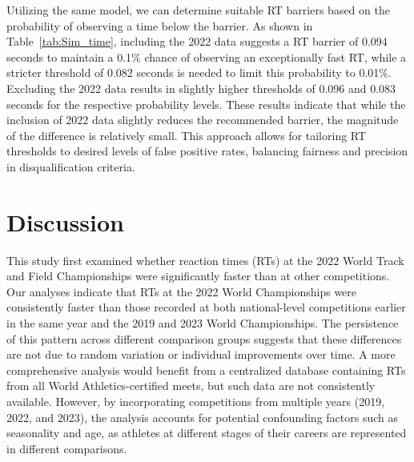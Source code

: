 \documentclass[12pt, letterpaper]{article}
\begin{document}
Utilizing the same model, we can determine suitable RT barriers
based on the probability of observing a time below the barrier. As shown in
Table~\ref{tab:Sim_time}, including the 2022 data suggests a RT
barrier of 0.094 seconds to maintain a 0.1\% chance of observing an
exceptionally fast RT, while a stricter threshold of 0.082 seconds
is needed to limit this probability to 0.01\%. Excluding the 2022 data results
in slightly higher thresholds of 0.096 and 0.083 seconds for the respective
probability levels. These results indicate that while the inclusion of 2022
data slightly reduces the recommended barrier, the magnitude of the difference
is relatively small. This approach allows for tailoring RT
thresholds to desired levels of false positive rates, balancing fairness and
precision in disqualification criteria.




\section{Discussion}\label{sec:concludingremarks}


This study first examined whether reaction times (RTs) at the 2022
World Track and Field Championships were significantly faster than at
other competitions. Our analyses indicate that RTs at the 2022 World
Championships were consistently faster than those recorded at both
national-level competitions earlier in the same year and the 2019 and
2023 World Championships. The persistence of this pattern across
different comparison groups suggests that these differences are not
due to random variation or individual improvements over time. A more
comprehensive analysis would benefit from a centralized database
containing RTs from all World Athletics-certified meets, but such data
are not consistently available. However, by incorporating competitions
from multiple years (2019, 2022, and 2023), the analysis accounts for
potential confounding factors such as seasonality and age, as athletes
at different stages of their careers are represented in different
comparisons.
\end{document}
